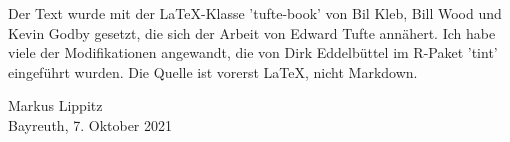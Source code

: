 Der Text wurde mit der LaTeX-Klasse 'tufte-book' von Bil Kleb, Bill Wood und Kevin Godby gesetzt, die sich der Arbeit von Edward Tufte annähert. Ich habe viele der Modifikationen angewandt, die von Dirk Eddelbüttel im R-Paket 'tint' eingeführt wurden. Die Quelle ist vorerst LaTeX, nicht Markdown.




\vspace{2\baselineskip}

Markus Lippitz \\ Bayreuth, 7. Oktober 2021

 
 



